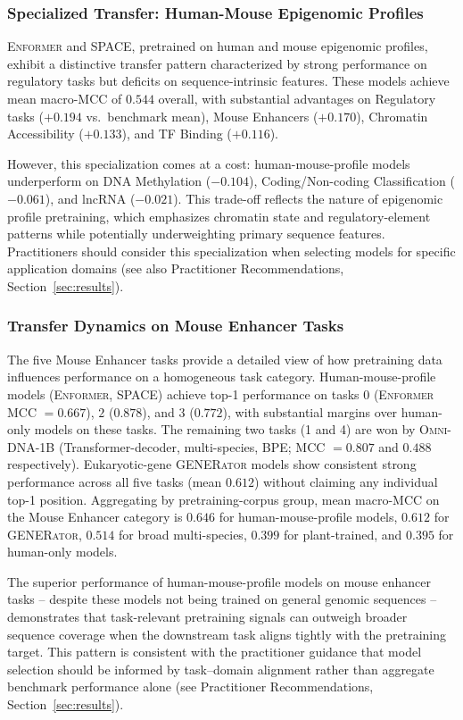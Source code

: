 \documentclass{article}
\theoremstyle{plain}
\theoremstyle{definition}
\theoremstyle{remark}
\begin{document}
\subsubsection{Specialized Transfer: Human-Mouse Epigenomic Profiles}

\textsc{Enformer} and \textsc{SPACE}, pretrained on human and mouse
epigenomic profiles, exhibit a distinctive transfer pattern
characterized by strong performance on regulatory tasks but
deficits on sequence-intrinsic features. These models achieve mean
macro-MCC of $0.544$ overall, with substantial advantages on
Regulatory tasks ($+0.194$ vs.\ benchmark mean), Mouse Enhancers
($+0.170$), Chromatin Accessibility ($+0.133$), and TF Binding
($+0.116$).

However, this specialization comes at a cost: human-mouse-profile
models underperform on DNA Methylation ($-0.104$), Coding/Non-coding
Classification ($-0.061$), and lncRNA ($-0.021$). This trade-off
reflects the nature of epigenomic profile pretraining, which
emphasizes chromatin state and regulatory-element patterns while
potentially underweighting primary sequence features. Practitioners
should consider this specialization when selecting models for
specific application domains (see also Practitioner Recommendations,
Section~\ref{sec:results}).

\subsubsection{Transfer Dynamics on Mouse Enhancer Tasks}

The five Mouse Enhancer tasks provide a detailed view of how
pretraining data influences performance on a homogeneous task
category. Human-mouse-profile models (\textsc{Enformer},
\textsc{SPACE}) achieve top-1 performance on tasks $0$
(\textsc{Enformer} MCC $= 0.667$), $2$ ($0.878$), and $3$ ($0.772$),
with substantial margins over human-only models on these tasks.
The remaining two tasks (1 and 4) are won by \textsc{Omni-DNA-1B}
(Transformer-decoder, multi-species, BPE; MCC $= 0.807$ and
$0.488$ respectively). Eukaryotic-gene \textsc{GENERator} models
show consistent strong performance across all five tasks (mean
$0.612$) without claiming any individual top-1 position. Aggregating
by pretraining-corpus group, mean macro-MCC on the Mouse Enhancer
category is $0.646$ for human-mouse-profile models, $0.612$ for
\textsc{GENERator}, $0.514$ for broad multi-species, $0.399$ for
plant-trained, and $0.395$ for human-only models.

The superior performance of human-mouse-profile models on mouse
enhancer tasks -- despite these models not being trained on
general genomic sequences -- demonstrates that task-relevant
pretraining signals can outweigh broader sequence coverage when
the downstream task aligns tightly with the pretraining target.
This pattern is consistent with the practitioner guidance that
model selection should be informed by task--domain alignment
rather than aggregate benchmark performance alone (see
Practitioner Recommendations, Section~\ref{sec:results}).
\end{document}
